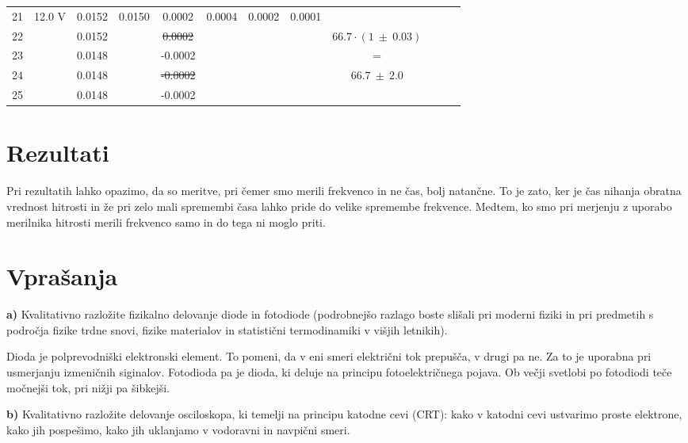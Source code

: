 \documentclass{report}
\begin{document}
\begin{table}[H]
\begin{adjustwidth}{-2.5 cm}{0 cm}
\begin{tabular}{cccccccccccc}

\midrule
21 & \multirow{5}{*}{12.0 V} & 0.0152 & \multirow{5}{*}{0.0150} & 0.0002 & \multirow{5}{*}{0.0004} & \multirow{5}{*}{0.0002} & \multirow{5}{*}{0.0001}\\
22 & & 0.0152 & & \sout{0.0002} & & & & $66.7 \cdot (1 \ \pm \ 0.03)$\\
23 & & 0.0148 & & -0.0002 & & & & =\\
24 & & 0.0148 & & \sout{-0.0002} & & & & $66.7 \ \pm \ 2.0 $\\
25 & & 0.0148 & & -0.0002\\
\bottomrule
\end{tabular}
\end{adjustwidth}
\end{table}
  
\pagebreak
\section{Rezultati}
Pri rezultatih lahko opazimo, da so meritve, pri čemer smo merili frekvenco in ne čas, 
bolj natančne. To je zato, ker je čas nihanja obratna vrednost hitrosti in že pri zelo mali spremembi
časa lahko pride do velike spremembe frekvence. Medtem, ko smo pri merjenju z uporabo merilnika hitrosti
merili frekvenco samo in do tega ni moglo priti.


\section{Vprašanja}

\textbf{a)} Kvalitativno razložite fizikalno delovanje diode in fotodiode
(podrobnejšo razlago boste slišali pri moderni fiziki in pri predmetih s področja fizike trdne snovi, 
fizike materialov in statistični termodinamiki v višjih letnikih).

\smallskip

\noindent Dioda je polprevodniški elektronski element. To pomeni, da v eni smeri električni tok prepušča, v drugi pa ne.
Za to je uporabna pri usmerjanju izmeničnih siginalov.
Fotodioda pa je dioda, ki deluje na principu fotoelektričnega pojava. Ob večji svetlobi po fotodiodi teče močnejši tok,
pri nižji pa šibkejši.

\bigskip


\noindent \textbf{b)} Kvalitativno razložite delovanje osciloskopa, 
ki temelji na principu katodne cevi (CRT): 
kako v katodni cevi ustvarimo proste elektrone, kako jih pospešimo, 
kako jih uklanjamo v vodoravni in navpični smeri.
\end{document}
